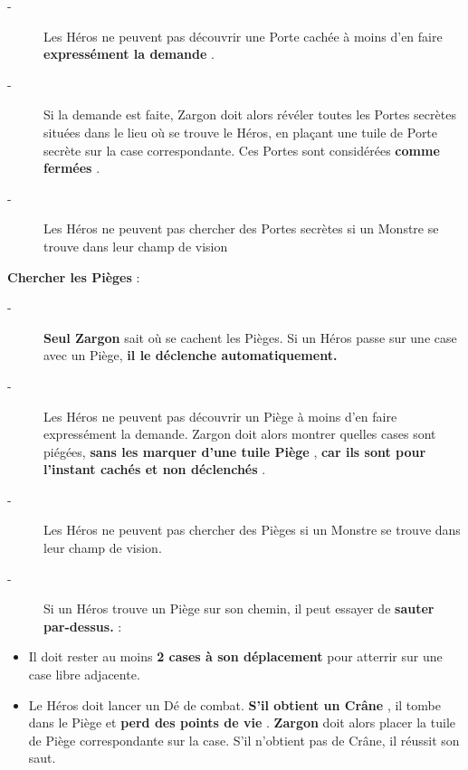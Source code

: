 \documentclass{scrartcl}%
\begin{document}
%
\begin{description}%
\item[{-} ]%
%
 Les Héros ne peuvent pas découvrir une Porte cachée à moins d'en faire %
\textcolor{mygreen}{%
\textbf{expressément la demande}%
}%
.
%
\item[{-} ]%
%
 Si la demande est faite, Zargon doit alors révéler toutes les Portes secrètes situées dans le lieu où se trouve le Héros, en plaçant une tuile de Porte secrète sur la case correspondante. Ces Portes sont considérées %
\textcolor{mygreen}{%
\textbf{comme fermées}%
}%
.
%
\item[{-} ]%
%
 Les Héros ne peuvent pas chercher des Portes secrètes si un Monstre se trouve dans leur champ de vision
%
\end{description}%
\textcolor{mygreen}{%
\textbf{Chercher les Pièges}%
}%
:
%
\begin{description}%
\item[{-} ]%
%
\textcolor{mygreen}{%
\textbf{Seul Zargon}%
}%
\textit{ }%
 sait où se cachent les Pièges. Si un Héros passe sur une case avec un Piège,%
\textcolor{mygreen}{%
\textbf{ il le déclenche automatiquement.}%
}%

%
\item[{-} ]%
%
 Les Héros ne peuvent pas découvrir un Piège à moins d'en faire expressément la demande. Zargon doit alors montrer quelles cases sont piégées,%
\textcolor{mygreen}{%
\textbf{ sans les marquer d'une tuile Piège}%
}%
, %
\textcolor{mygreen}{%
\textbf{car ils sont pour l'instant cachés et non déclenchés}%
}%
.
%
\item[{-} ]%
%
 Les Héros ne peuvent pas chercher des Pièges si un Monstre se trouve dans leur champ de vision.
%
\item[{-} ]%
%
 Si un Héros trouve un Piège sur son chemin, il peut essayer de %
\textcolor{mygreen}{%
\textbf{sauter par{-}dessus.}%
}%
\textit{ }%
 :
%
\end{description}%
\begin{itemize}%
\item%
%
 Il doit rester au moins%
\textcolor{mygreen}{%
\textbf{ 2 cases à son déplacement }%
}%
pour atterrir sur une case libre adjacente.
%
\item%
%
 Le Héros doit lancer un Dé de combat. %
\textcolor{mygreen}{%
\textbf{S'il obtient un Crâne}%
}%
, il tombe dans le Piège et %
\textcolor{mygreen}{%
\textbf{perd des points de vie}%
}%
. %
\textcolor{mygreen}{%
\textbf{Zargon}%
}%
\textit{ }%
 doit alors placer la tuile de Piège correspondante sur la case. S'il n'obtient pas de Crâne, il réussit son saut.
%
\end{itemize}%
\end{document}
